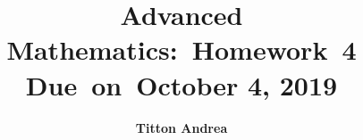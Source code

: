 \newcommand{\hmwkTitle}{Homework\ 4}
\newcommand{\hmwkDueDate}{October 4, 2019}
\newcommand{\hmwkClass}{Advanced Mathematics}
\newcommand{\hmwkAuthorName}{\textbf{Titton Andrea}}

%
%

\title{
    \vspace{2in}
    \textmd{\textbf{\hmwkClass:\ \hmwkTitle}}\\
    \normalsize\vspace{0.1in}\small{Due\ on\ \hmwkDueDate}\\
    \vspace{3in}
}

\author{\hmwkAuthorName}
\date{}

\renewcommand{\part}[1]{\textbf{\large Part \Alph{partCounter}}\stepcounter{partCounter}\\}

%
%

\newcommand{\alg}[1]{\textsc{\bfseries \footnotesize #1}}

\newcommand{\deriv}[1]{\frac{\mathrm{d}}{\mathrm{d}x} (#1)}

\newcommand{\pderiv}[2]{\frac{\partial}{\partial #1} (#2)}

\newcommand{\dx}{\mathrm{d}x}

\newcommand{\solution}{\textbf{\large Solution}}

\newcommand{\E}{\mathrm{E}}
\newcommand{\Var}{\mathrm{Var}}
\newcommand{\Cov}{\mathrm{Cov}}
\newcommand{\Bias}{\mathrm{Bias}}

\newcommand{\norm}[1]{\left\lVert#1\right\rVert}
\newcommand{\abs}[1]{\left\lvert#1\right\rvert}




\maketitle

\pagebreak

